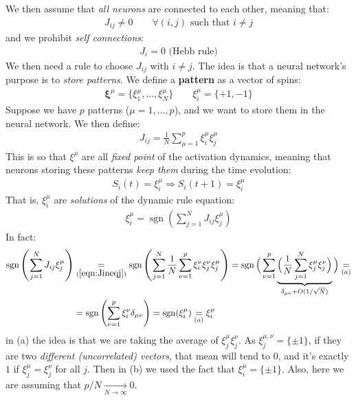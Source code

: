 \documentclass[../template.tex]{subfiles}
\begin{document}
We then assume that \textit{all neurons} are connected to each other, meaning that:
\begin{align*}
    J_{ij} \neq 0 \qquad \forall (i,j) \text{ such that } i \neq j 
\end{align*} 
and we prohibit \textit{self connections}:
\begin{align}
    J_{\iota} = 0 \text{ (Hebb rule)}
    \label{eqn:Jij}
\end{align} 
We then need a rule to choose $J_{ij}$ with $i \neq j$. The idea is that a neural network's purpose is to \textit{store patterns}. We define a \textbf{pattern} as a vector of spins:
\begin{align*}
    \bm{\xi}^\mu = \{\xi_1^\mu, \dots, \xi_N^\mu\} \qquad \xi_i^\mu = \{+1,-1\}
\end{align*} 
Suppose we have $p$ patterns ($\mu = 1, \dots, p$), and we want to store them in the neural network. We then define:
\begin{align}
    J_{ij} = \frac{1}{N} \sum_{\mu = 1}^p \xi_i^\mu\xi_j^\mu  
    \label{eqn:Jineqj}
\end{align} 
This is so that $\xi^\mu$ are all \textit{fixed point} of the activation dynamics, meaning that neurons storing these patterns \textit{keep them} during the time evolution:
\begin{align*}
    S_i(t) = \xi_i^\mu \Rightarrow S_i(t+1) = \xi_i^\mu
\end{align*}  
That is, $\xi_i^\mu$ are \textit{solutions} of the dynamic rule equation:
\begin{align*}
    \xi_i^\mu = \operatorname{sgn}\left(\sum_{j=1}^N J_{ij} \xi_j^\mu \right) 
\end{align*}  
In fact:
\begin{align*}
    \operatorname{sgn} \left(\sum_{j=1}^N J_{ij} \xi_j^\mu\right) &\underset{(\ref{eqn:Jineqj})}{=} \operatorname{sgn}\left(\sum_{j=1}^N \frac{1}{N} \sum_{\nu=1}^p \xi_i^\nu \xi_j^\nu \xi_j^\mu \right) = \operatorname{sgn}\Big(\sum_{\nu = 1}^p \underbrace{\Big(\frac{1}{N} \sum_{j=1}^N \xi_j^\mu \xi_j^\nu \Big)}_{\delta_{\mu \nu} + O(1/\sqrt{N})} \Big) \underset{(a)}{=} \\
    &= \operatorname{sgn}\left(\sum_{\nu=1}^p \xi_i^\nu \delta_{\mu \nu}\right) = \operatorname{sgn}(\xi_i^\mu) \underset{(a)}{=}  \xi_i^\mu 
\end{align*}
in (a) the idea is that we are taking the average of $\xi_j^\mu \xi_j^\nu$. As $\xi_j^{\mu, \nu} = \{\pm 1\}$, if they are two \textit{different (uncorrelated) vectors}, that mean will tend to $0$, and it's exactly $1$ if $\xi_j^\mu = \xi_j^\nu$ for all $j$. Then in (b) we used the fact that $\xi_i^\mu = \{\pm 1\}$. Also, here we are assuming that $p/N  \xrightarrow[N \to \infty]{}  0$.
\medskip  
\end{document}
